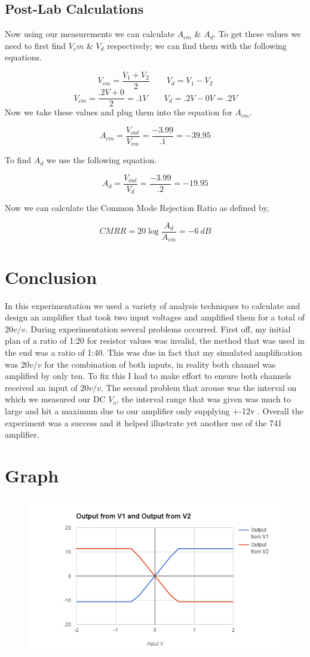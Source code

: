 \documentclass[12pt]{article}
\begin{document}
\newpage
\subsection{Post-Lab Calculations}
Now using our measurements we can calculate $A_{cm}$ \& $A_d$. To get these values we need to first find $V_cm$ \& $V_d$ respectively; we can find them with the following equations.

$$
V_{cm} = \frac{V_1 + V_2}{2} \qquad V_d = V_1 - V_2
$$
$$V_{cm}= \frac{.2V + 0}{2} = .1V \qquad V_d =.2V - 0V = .2V$$
Now we take these values and plug them into the equation for $A_{cm}$.

$$A_{cm} =\frac{V_{out}}{V_{cm}} = \frac{-3.99}{.1} = -39.95$$

To find $A_d$ we use the following equation.

$$A_d = \frac{V_{out}}{V_d} = \frac{-3.99}{.2} = -19.95$$

Now we can calculate the Common Mode Rejection Ratio as defined by,
 
$$CMRR = 20 \log \frac{A_d}{A_{cm}} = - 6 \ dB$$






\section{Conclusion}

In this experimentation we used a variety of analysis techniques to calculate and design an amplifier that took two input voltages and amplified them for a total of $20v/v$. During experimentation several problems occurred. First off, my initial plan of a ratio of 1:20 for resistor values was invalid, the method that was used in the end was a ratio of 1:40. This was due in fact that my simulated amplification was $20v/v$ for the combination of both inputs, in reality both channel was amplified by only ten. To fix this I had to make effort to ensure both channels received an input of $20v/v$. The second problem that arouse was the interval on which we measured our DC $V_o$, the interval range that was given was much to large and hit a maximum due to our amplifier only supplying +-12v . Overall the experiment was a success and it helped illustrate yet another use of the 741 amplifier.

\newpage
\section{Graph}
\begin{figure}[h]
	\label{amp}
	\caption{}
	\centering
	\includegraphics[width=1\textwidth]{graph}
	\end{figure}
\end{document}
